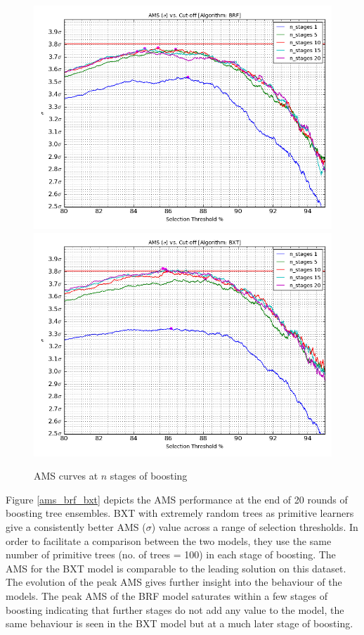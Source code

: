 \begin{figure}
\includegraphics[width=\textwidth]{images/AMS_Curve_BRF_Cluster.png}
\includegraphics[width=\textwidth]{images/AMS_Curve_BXT_Cluster.png}
\caption{AMS curves at $n$ stages of boosting}
\label{ams_boosting}
\end{figure}

Figure \ref{ams_brf_bxt} depicts the AMS performance at the end of 20 rounds of boosting tree ensembles. BXT with extremely random trees as primitive learners give a consistently better AMS ($\sigma$) value across a range of selection thresholds. In order to facilitate a comparison between the two models, they use the same number of primitive trees (no. of trees = 100) in each stage of boosting. The AMS for the BXT model is comparable to the leading solution on this dataset. The evolution of the peak AMS gives further insight into the behaviour of the models. The peak AMS of the BRF model saturates within a few stages of boosting indicating that further stages do not add any value to the model, the same behaviour is seen in the BXT model but at a much later stage of boosting.   

